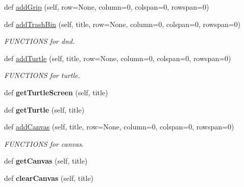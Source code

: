 \begin{DoxyCompactItemize}
def \hyperlink{class_python_01_g_u_i_1_1appjar_1_1gui_a48bcb77cc267e96ec065712e593b6449}{add\+Grip} (self, row=None, column=0, colspan=0, rowspan=0)
\item 
def \hyperlink{class_python_01_g_u_i_1_1appjar_1_1gui_aa8ec86a91c223e0c5ba3f87ba0ca2873}{add\+Trash\+Bin} (self, title, row=None, column=0, colspan=0, rowspan=0)
\begin{DoxyCompactList}\small\item\em F\+U\+N\+C\+T\+I\+O\+NS for dnd. \end{DoxyCompactList}\item 
def \hyperlink{class_python_01_g_u_i_1_1appjar_1_1gui_a09f467f40cfc1b81ec4567d7cacaa5c2}{add\+Turtle} (self, title, row=None, column=0, colspan=0, rowspan=0)
\begin{DoxyCompactList}\small\item\em F\+U\+N\+C\+T\+I\+O\+NS for turtle. \end{DoxyCompactList}\item 
\mbox{\label{class_python_01_g_u_i_1_1appjar_1_1gui_a45245ad390ee0083b7d60de463a6b825}} 
def {\bfseries get\+Turtle\+Screen} (self, title)
\item 
\mbox{\label{class_python_01_g_u_i_1_1appjar_1_1gui_aafa221d6cf483c57055880df5ba54233}} 
def {\bfseries get\+Turtle} (self, title)
\item 
def \hyperlink{class_python_01_g_u_i_1_1appjar_1_1gui_a6459e922c9b6fd74d27a69bbb17845e3}{add\+Canvas} (self, title, row=None, column=0, colspan=0, rowspan=0)
\begin{DoxyCompactList}\small\item\em F\+U\+N\+C\+T\+I\+O\+NS for canvas. \end{DoxyCompactList}\item 
\mbox{\label{class_python_01_g_u_i_1_1appjar_1_1gui_a66ab3cf887d744e800a623da1e15cf59}} 
def {\bfseries get\+Canvas} (self, title)
\item 
\mbox{\label{class_python_01_g_u_i_1_1appjar_1_1gui_a868b403fbb4aa01df891b34b289df418}} 
def {\bfseries clear\+Canvas} (self, title)
\item 
\mbox{\label{class_python_01_g_u_i_1_1appjar_1_1gui_ac5b5a9a4df38744375c0e0900013a61b}} 

\end{DoxyCompactItemize}
